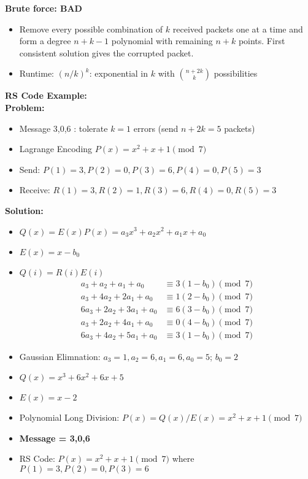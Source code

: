 \documentclass{article}\usepackage{amsmath,amssymb,amsthm,tikz,tkz-graph,color,chngpage,soul,hyperref,csquotes,graphicx,floatrow,polynom}\newcommand*{\QEDB}{\hfill\ensuremath{\square}}\newtheorem*{prop}{Proposition}\renewcommand{\theenumi}{\alph{enumi}}\usepackage[shortlabels]{enumitem}\usepackage[nobreak=true]{mdframed}\usetikzlibrary{matrix,calc}\MakeOuterQuote{"}\usepackage[margin=0.75in]{geometry} \newtheorem{theorem}{Theorem}
\begin{document}
\begin{mdframed}

\textbf{Brute force: BAD}
\begin{itemize}
\item Remove every possible combination of $k$ received packets one at a time and form a degree $n+k-1$ polynomial with remaining $n+k$ points. First consistent solution gives the corrupted packet.
\item Runtime: $(n/k)^k$: exponential in $k$ with $\binom{n+2k}{k}$ possibilities
\end{itemize}
\end{mdframed}

\begin{mdframed}
\textbf{RS Code Example:}\\
\textbf{Problem:}
\begin{itemize}
\item Message 3,0,6 : tolerate $k = 1$ errors (send $n+2k = 5$ packets)
\item Lagrange Encoding $P(x) = x^2 + x + 1 \pmod{7}$
\item Send: $P(1) = 3, P(2) = 0, P(3) = 6, P(4) = 0, P(5) = 3$
\item Receive: $R(1) = 3, R(2) = 1, R(3) = 6, R(4) = 0, R(5) = 3$
\end{itemize}
\textbf{Solution:}
\begin{itemize}
\item $Q(x) = E(x)P(x) = a_3x^3+a_2x^2+a_1x+a_0$
\item $E(x) = x-b_0$
\item $Q(i) = R(i)E(i)$
\begin{align*}
a_3+a_2+a_1+a_0 & \equiv 3(1-b_0) \pmod{7} \\
a_3+4a_2+2a_1+a_0 & \equiv 1(2-b_0) \pmod{7} \\
6a_3+2a_2+3a_1+a_0 & \equiv 6(3-b_0) \pmod{7} \\
a_3+2a_2+4a_1+a_0 & \equiv 0(4-b_0) \pmod{7} \\
6a_3+4a_2+5a_1+a_0 & \equiv 3(1-b_0) \pmod{7} 
\end{align*}
\item Gaussian Elimnation: $a_3=1, a_2=6, a_1=6, a_0=5$; $b_0=2$
\item $Q(x) = x^3+6x^2+6x+5$
\item $E(x)=x-2$
\item Polynomial Long Division: $P(x) = Q(x)/E(x) = x^2+x+1 \pmod{7}$\\
\item\textbf{Message = 3,0,6}
\item RS Code: $P(x) = x^2 + x + 1 \pmod{7}$ where $P(1) = 3, P(2) = 0, P(3) = 6$
\end{itemize}
\end{mdframed}
\end{document}
